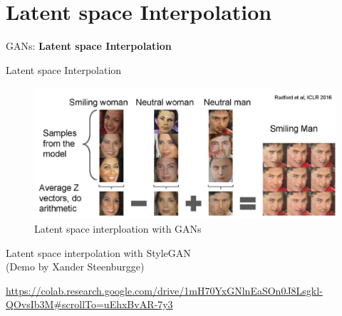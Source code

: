 \section{Latent space Interpolation}
\begin{frame}{}
    \LARGE GANs: \textbf{Latent space Interpolation}
\end{frame}

\begin{frame}[allowframebreaks]{Latent space Interpolation}
\begin{figure}
    \centering
    \includegraphics[height=0.9\textheight, width=\textwidth, keepaspectratio]{images/gan/gan_latent.png}
    \caption*{Latent space interploation with GANs}
\end{figure}
\framebreak
\centering
Latent space interpolation with StyleGAN\\
\centering
(Demo by Xander Steenburgge)\\

\vspace{\baselineskip}

\centering
\href{https://colab.research.google.com/drive/1mH70YxGNlnEaSOn0J8Lsgkl-QOvsIb3M#scrollTo=uEhxBvAR-7y3}{https://colab.research.google.com/drive/1mH70YxGNlnEaSOn0J8Lsgkl-QOvsIb3M#scrollTo=uEhxBvAR-7y3}
\end{frame}
